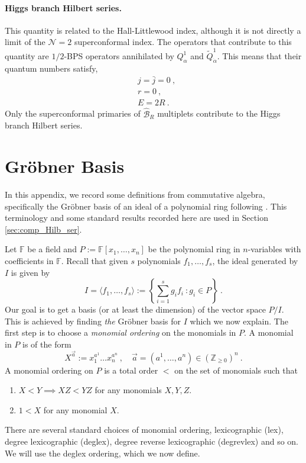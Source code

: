 \documentclass[a4paper,10pt]{article}
\def\IF{\mathds{F}}
\def\IZ{{\mathds{Z}}}
\begin{document}
\begin{appendix}
\paragraph{Higgs branch Hilbert series.} This quantity is related to the Hall-Littlewood index, although it is not directly a limit of the $\mathcal{N}=2$ superconformal index. The operators that contribute to this quantity are $1/2$-BPS operators annihilated by $Q^1_{\alpha}$ and $\tilde{Q}^1_{\dot{\alpha}}$. This means that their quantum numbers satisfy,
\begin{equation}
    \begin{split}
        &j=\bar{j}=0~, \\
        &r=0~, \\
        &E=2R~.
    \end{split}
\end{equation}
Only the superconformal primaries of $\hat{\mathcal{B}}_R$ multiplets contribute to the Higgs branch Hilbert series. 
\section{Gr\"{o}bner Basis}\label{app:Grob}
In this appendix, we record some definitions from commutative algebra, specifically the Gr\"{o}bner basis of an ideal of a polynomial ring following \cite{loustaunau1994introduction}. This terminology and some standard results recorded here are used in Section \ref{sec:comp_Hilb_ser}.

Let $\mathds{F}$ be a field and $P:=\IF[x_1,\dots,x_n]$ be the polynomial ring in $n$-variables with coefficients in $\IF$. 
Recall that given $s$ polynomials $f_1,\dots,f_s$, the ideal generated by $I$ is given by 
\begin{equation}
    I=\langle f_1,\dots,f_s\rangle:=\left\{\sum_{i=1}^sg_if_i~:g_i\in P\right\}~.
\end{equation}
Our goal is to get a basis (or at least the dimension) of the vector space $P/I$. This is achieved by finding \textit{the} Gr\"{o}bner basis for $I$ which we now explain. The first step is to choose a \textit{monomial ordering} on the monomials in $P$. A monomial in $P$ is of the form 
\begin{equation}
    X^{\vec{a}}:=x_1^{a^1}\dots x_n^{a^n}~,\quad \vec{a}=(a^1,\dots,a^n)\in (\IZ_{\geq 0})^n~.
\end{equation}
A monomial ordering on $P$ is a total order $<$ on the set of monomials such that  
\begin{enumerate}[(1)]
    \item $X<Y\implies XZ<YZ$ for any monomials $X,Y,Z$.
    \item $1<X$ for any monomial $X$.
\end{enumerate}
There are several standard choices of monomial ordering, lexicographic (lex), degree lexicographic (deglex), degree reverse lexicographic (degrevlex) and so on. We will use the deglex ordering, which we now define.

\end{appendix}
\end{document}
